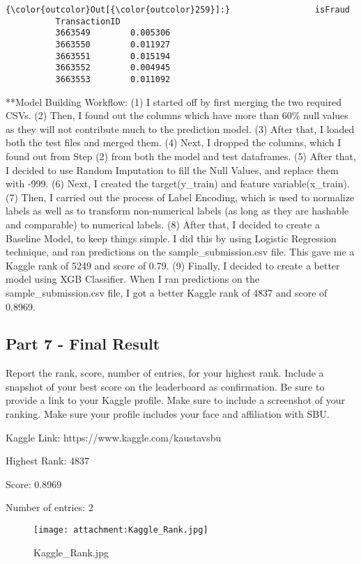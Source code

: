 \documentclass[11pt]{article}
\makeatletter
\def\maxwidth{\ifdim\Gin@nat@width>\linewidth\linewidth
    \else\Gin@nat@width\fi}
\let\Oldincludegraphics\includegraphics
\renewcommand{\includegraphics}[1]{\Oldincludegraphics[width=.8\maxwidth]{#1}}
\makeatother
\begin{document}
\begin{Verbatim}[commandchars=\\\{\}]
{\color{outcolor}Out[{\color{outcolor}259}]:}                 isFraud
          TransactionID          
          3663549        0.005306
          3663550        0.011927
          3663551        0.015194
          3663552        0.004945
          3663553        0.011092
\end{Verbatim}
            
    **Model Building Workflow: (1) I started off by first merging the two
required CSVs. (2) Then, I found out the columns which have more than
60\% null values as they will not contribute much to the prediction
model. (3) After that, I loaded both the test files and merged them. (4)
Next, I dropped the columns, which I found out from Step (2) from both
the model and test dataframes. (5) After that, I decided to use Random
Imputation to fill the Null Values, and replace them with -999. (6)
Next, I created the target(y\_train) and feature variable(x\_train). (7)
Then, I carried out the process of Label Encoding, which is used to
normalize labels as well as to transform non-numerical labels (as long
as they are hashable and comparable) to numerical labels. (8) After
that, I decided to create a Baseline Model, to keep things simple. I did
this by using Logistic Regression technique, and ran predictions on the
sample\_submission.csv file. This gave me a Kaggle rank of 5249 and
score of 0.79. (9) Finally, I decided to create a better model using XGB
Classifier. When I ran predictions on the sample\_submission.csv file, I
got a better Kaggle rank of 4837 and score of 0.8969.

    \hypertarget{part-7---final-result}{%
\subsection{Part 7 - Final Result}\label{part-7---final-result}}

    Report the rank, score, number of entries, for your highest rank.
Include a snapshot of your best score on the leaderboard as
confirmation. Be sure to provide a link to your Kaggle profile. Make
sure to include a screenshot of your ranking. Make sure your profile
includes your face and affiliation with SBU.

    Kaggle Link: https://www.kaggle.com/kaustavsbu

    Highest Rank: 4837

    Score: 0.8969

    Number of entries: 2

    \begin{figure}
\centering
\texttt{[image: attachment:Kaggle\_Rank.jpg]}
\caption{Kaggle\_Rank.jpg}
\end{figure}


    
    
    
    
\end{document}
